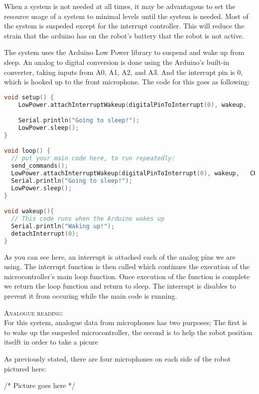 \documentclass[12pt,a4paper]{article}
\begin{document}
When a system is not needed at all times, it may be advantagous to set the resource usage of a system to minimal levels until the system is needed. Most of the system is suspeded except for the interrupt controller. This will reduce the strain that the arduino has on the robot's battery that the robot is not active.

The system uses the Arduino Low Power library to suspend and wake up from sleep.
An analog to digital conversion is done using the Arduino's built-in converter, taking inputs from A0, A1, A2, and A3.
And the interrupt pin is 0, which is hooked up to the front microphone.
The code for this goes as following:

\begin{lstlisting}[language=C, caption=Low Power Code]
void setup() {
    LowPower.attachInterruptWakeup(digitalPinToInterrupt(0), wakeup,   CHANGE);

    Serial.println("Going to sleep!");
    LowPower.sleep();
}

void loop() {
  // put your main code here, to run repeatedly:
  send_commands();
  LowPower.attachInterruptWakeup(digitalPinToInterrupt(0), wakeup,   CHANGE);
  Serial.println("Going to sleep!");
  LowPower.sleep();
}

void wakeup(){
  // This code runs when the Arduino wakes up
  Serial.println("Waking up!");
  detachInterrupt(0);
}
\end{lstlisting}

As you can see here, an interrupt is attached each of the analog pins we are using.
The interrupt function is then called which continues the execution of the microcontroller's main loop function.
Once execution of the function is complete we return the loop function and return to sleep.
The interrupt is disables to prevent it from occuring while the main code is running.

\clearpage

\newpage

\textsc{\LARGE Analogue reading: }\\[1.5cm]

For this system, analogue data from microphones has two purposes; The first is to wake up the suspeded microcontroller, the second is to help the robot position itselft in order to take a picure

As previously stated, there are four microphones on each side of the robot pictured here:

/* Picture goes here */

\clearpage
\end{document}
